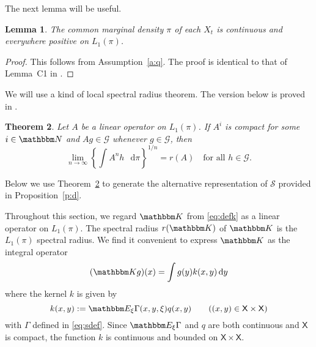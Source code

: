 \documentclass[12pt, reqno]{amsart}
\newcommand{\1}{\mathbbm 1}
\newcommand*\diff{\mathop{}\!\mathrm{d}}
\newcommand{\gG}{\mathscr G}
\newcommand{\sS}{\mathscr S}
\newcommand{\NN}{\mathbbm N}
\newcommand{\KK}{\mathbbm K}
\newcommand{\EE}{\mathbbm E}
\newcommand{\XX}{\mathsf X}
\theoremstyle{plain}
\newtheorem{theorem}{Theorem}[section]
\newtheorem{lemma}[theorem]{Lemma}
\theoremstyle{definition}
\begin{document}
The next lemma will be useful.

\begin{lemma}
    The common marginal density $\pi$ of each $X_t$ is continuous and
    everywhere positive on $L_1(\pi)$.
\end{lemma}

\begin{proof}
    This follows from Assumption~\ref{a:q}.  The proof is identical to that of
    Lemma~C1 in \cite{borovicka2020necessary}.
\end{proof}

We will use a kind of local spectral radius theorem.  The version below is
proved in \cite{borovicka2020necessary}.

\begin{theorem}
    \label{t:lsr2}
    Let $A$ be a linear operator on $L_1(\pi)$.  If $A^i$ is compact for some
    $i \in \NN$ and $A g \in \gG$ whenever $g \in \gG$, then
    \begin{equation}
        \label{eq:lsr2}
        \lim_{n \to \infty}
        \left\{ \int A^n h \, \diff \pi \right\}^{1/n} = r(A)
        \quad \text{for all } h \in \gG.
    \end{equation}
\end{theorem}

Below we use Theorem~\ref{t:lsr2} to generate the alternative representation
of $\sS$ provided in Proposition~\ref{p:d}.

Throughout this section, we regard $\KK$ from \eqref{eq:defk} as a linear
operator on $L_1(\pi)$.  The spectral radius $r(\KK)$ of $\KK$ is the
$L_1(\pi)$ spectral radius.  We find it convenient to express $\KK$ as the
integral operator
%
\begin{equation}\label{eq:defkio}
    (\KK g)(x) = \int g(y) k(x, y) \diff y 
\end{equation}
%
where the kernel $k$ is given by 
%
\begin{equation*}
    k(x, y) 
    := \EE_\xi \Gamma(x, y, \xi)
    q(x, y) 
    \qquad ((x, y) \in \XX \times \XX)
\end{equation*}
%
with $\Gamma$ defined in \eqref{eq:sdef}.
Since $\EE_\xi\Gamma$ and $q$ are both continuous and $\XX$ is compact, the function
$k$ is continuous and bounded on $\XX \times \XX$.
\end{document}
